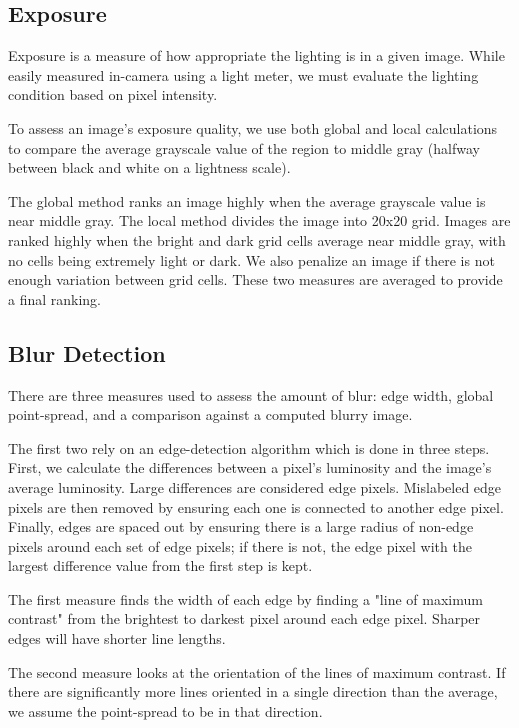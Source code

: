 \documentclass{sig-alternate}
\begin{document}
\subsection{Exposure}

Exposure is a measure of how appropriate the lighting is in a given image. While easily measured in-camera using a light meter, we must evaluate the lighting condition based on pixel intensity.

To assess an image's exposure quality, we use both global and local calculations to compare the average grayscale value of the region to middle gray (halfway between black and white on a lightness scale)\cite{ppr:1815}.

The global method ranks an image highly when the average grayscale value is near middle gray. The local method divides the image into 20x20 grid. Images are ranked highly when the bright and dark grid cells average near middle gray, with no cells being extremely light or dark. We also penalize an image if there is not enough variation between grid cells. These two measures are averaged to provide a final ranking.

\subsection{Blur Detection}
There are three measures used to assess the amount of blur: edge width, global point-spread, and a comparison against a computed blurry image.

The first two rely on an edge-detection algorithm which is done in three steps. First, we calculate the differences between a pixel's luminosity and the image's average luminosity. Large differences are considered edge pixels. Mislabeled edge pixels are then removed by ensuring each one is connected to another edge pixel. Finally, edges are spaced out by ensuring there is a large radius of non-edge pixels around each set of edge pixels; if there is not, the edge pixel with the largest difference value from the first step is kept. %

The first measure finds the width of each edge by finding a "line of maximum contrast" from the brightest to darkest pixel around each edge pixel. Sharper edges will have shorter line lengths.

The second measure looks at the orientation of the lines of maximum contrast. If there are significantly more lines oriented in a single direction than the average, we assume the point-spread to be in that direction. %
\end{document}

